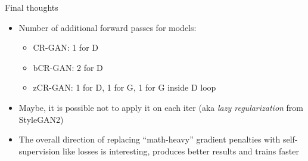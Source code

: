 \documentclass[handout, 10pt]{beamer}
\begin{document}
\begin{frame}{Final thoughts}
\begin{itemize}
    \item\pause Number of additional forward passes for models:
    \begin{itemize}
        \item\pause CR-GAN: 1 for D
        \item\pause bCR-GAN: 2 for D
        \item\pause zCR-GAN: 1 for D, 1 for G, 1 for G inside D loop
    \end{itemize}
    \item\pause Maybe, it is possible not to apply it on each iter (aka \textit{lazy regularization} from StyleGAN2)
    \item\pause The overall direction of replacing ``math-heavy'' gradient penalties with self-supervision like losses is interesting, produces better results and trains faster
\end{itemize}
\end{frame}
\end{document}

